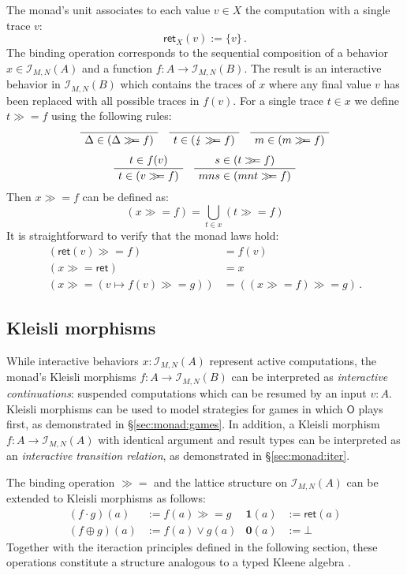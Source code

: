 \documentclass{article}
\newcommand{\kw}[1]{\ensuremath{ \mathsf{#1} }}
\newcommand{\bind}{\gg\!\!=}
\begin{document}
The monad's unit associates to each value $v \in X$
the computation with a single trace $v$:
\[
    \kw{ret}_X(v) := \{ v \} \,.
\]
The binding operation corresponds to
the sequential composition of
a behavior $x \in \mathcal{I}_{M,N}(A)$ and
a function $f : A \rightarrow \mathcal{I}_{M,N}(B)$.
The result is an interactive behavior in $\mathcal{I}_{M,N}(B)$ which
contains the traces of $x$ where
any final value $v$ has been replaced with
all possible traces in $f(v)$.
For a single trace $t \in x$ we define $t \bind f$
using the following rules:
\begin{gather*}
  \AxiomC{}
  \UnaryInfC{$\Delta \in (\Delta \bind f)$}
  \DisplayProof
  \quad
  \AxiomC{}
  \UnaryInfC{$t \in (\lightning \bind f)$}
  \DisplayProof
  \quad
  \AxiomC{}
  \UnaryInfC{$m \in (m \bind f)$}
  \DisplayProof
  \\[1ex]
  \AxiomC{$t \in f(v)$}
  \UnaryInfC{$t \in (v \bind f)$}
  \DisplayProof
  \quad
  \AxiomC{$s \in (t \bind f)$}
  \UnaryInfC{$mns \in (mnt \bind f)$}
  \DisplayProof
\end{gather*}
Then $x \bind f$ can be defined as:
\[
    (x \bind f) = \bigcup_{t \in x} (t \bind f)
\]
It is straightforward to verify that
the monad laws hold:
\begin{align*}
  (\kw{ret}(v) \bind f) &= f(v) \\
  (x \bind \kw{ret}) &= x \\
  (x \bind (v \mapsto f(v) \bind g)) &= ((x \bind f) \bind g) \,.
\end{align*}


\subsection{Kleisli morphisms} %

While interactive behaviors $x : \mathcal{I}_{M,N}(A)$
represent active computations,
the monad's Kleisli morphisms $f : A \rightarrow \mathcal{I}_{M,N}(B)$
can be interpreted as \emph{interactive continuations}:
suspended computations which can be resumed by an input $v : A$.
Kleisli morphisms can be used to
model strategies for games in which $\kw{O}$ plays first,
as demonstrated in \S\ref{sec:monad:games}.
In addition,
a Kleisli morphism
$f : A \rightarrow \mathcal{I}_{M,N}(A)$
with identical argument and result types
can be interpreted as an \emph{interactive transition relation},
as demonstrated in \S\ref{sec:monad:iter}.

The binding operation $\bind$
and the lattice structure on $\mathcal{I}_{M,N}(A)$
can be extended to Kleisli morphisms as follows:
\begin{align*}
    (f \cdot g)(a) &:= f(a) \bind g &
    \mathbf{1}(a) &:= \kw{ret}(a) \\
    (f \oplus g)(a) &:= f(a) \vee g(a) &
    \mathbf{0}(a) &:= \bot
\end{align*}
Together with the iteraction principles
defined in the following section,
these operations constitute a structure
analogous to a typed Kleene algebra \cite{tka}.
\end{document}
